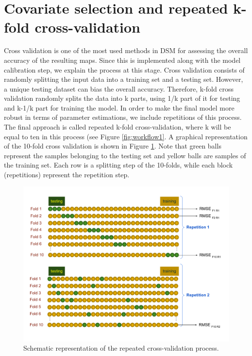 \documentclass[
  10pt,
  b5paper,
  oneside]{book}
\begin{document}
\hypertarget{covariate-selection-and-repeated-k-fold-cross-validation}{%
\section{Covariate selection and repeated k-fold cross-validation}\label{covariate-selection-and-repeated-k-fold-cross-validation}}

Cross validation is one of the most used methods in DSM for assessing the overall accuracy of the resulting maps. Since this is implemented along with the model calibration step, we explain the process at this stage. Cross validation consists of randomly splitting the input data into a training set and a testing set. However, a unique testing dataset can bias the overall accuracy. Therefore, k-fold cross validation randomly splits the data into k parts, using 1/k part of it for testing and k-1/k part for training the model. In order to make the final model more robust in terms of parameter estimations, we include repetitions of this process. The final approach is called repeated k-fold cross-validation, where k will be equal to ten in this process (see Figure \ref{fig:workflow1}. A graphical representation of the 10-fold cross validation is shown in Figure \ref{fig:cv}. Note that green balls represent the samples belonging to the testing set and yellow balls are samples of the training set. Each row is a splitting step of the 10-folds, while each block (repetitions) represent the repetition step.

\begin{figure}
\includegraphics[width=27.78in]{images/cv} \caption{Schematic representation of the repeated cross-validation process.}\label{fig:cv}
\end{figure}
\end{document}
